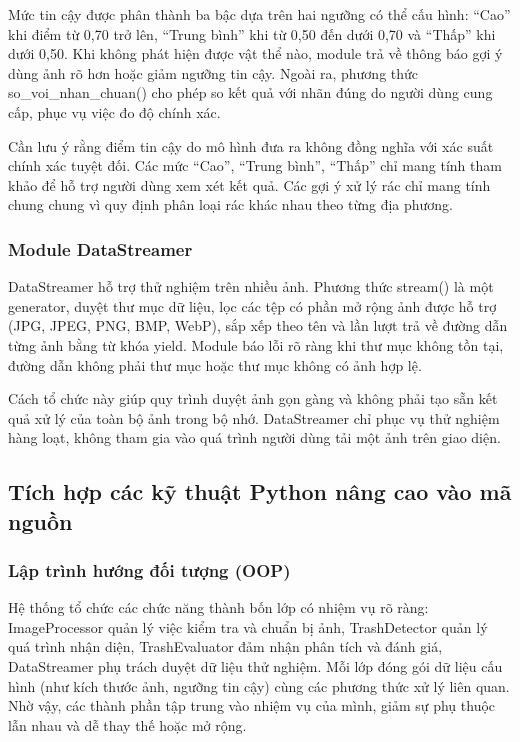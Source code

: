 \documentclass[a4paper,13pt]{extarticle}
\begin{document}
Mức tin cậy được phân thành ba bậc dựa trên hai ngưỡng có thể cấu hình: “Cao” khi điểm từ 0,70 trở lên, “Trung bình” khi từ 0,50 đến dưới 0,70 và “Thấp” khi dưới 0,50. Khi không phát hiện được vật thể nào, module trả về thông báo gợi ý dùng ảnh rõ hơn hoặc giảm ngưỡng tin cậy. Ngoài ra, phương thức so\_voi\_nhan\_chuan() cho phép so kết quả với nhãn đúng do người dùng cung cấp, phục vụ việc đo độ chính xác.

Cần lưu ý rằng điểm tin cậy do mô hình đưa ra không đồng nghĩa với xác suất chính xác tuyệt đối. Các mức “Cao”, “Trung bình”, “Thấp” chỉ mang tính tham khảo để hỗ trợ người dùng xem xét kết quả. Các gợi ý xử lý rác chỉ mang tính chung chung vì quy định phân loại rác khác nhau theo từng địa phương.

\subsubsection{ Module DataStreamer}

DataStreamer hỗ trợ thử nghiệm trên nhiều ảnh. Phương thức stream() là một generator, duyệt thư mục dữ liệu, lọc các tệp có phần mở rộng ảnh được hỗ trợ (JPG, JPEG, PNG, BMP, WebP), sắp xếp theo tên và lần lượt trả về đường dẫn từng ảnh bằng từ khóa yield. Module báo lỗi rõ ràng khi thư mục không tồn tại, đường dẫn không phải thư mục hoặc thư mục không có ảnh hợp lệ.

Cách tổ chức này giúp quy trình duyệt ảnh gọn gàng và không phải tạo sẵn kết quả xử lý của toàn bộ ảnh trong bộ nhớ. DataStreamer chỉ phục vụ thử nghiệm hàng loạt, không tham gia vào quá trình người dùng tải một ảnh trên giao diện.

\subsection{ Tích hợp các kỹ thuật Python nâng cao vào mã nguồn }

\subsubsection{ Lập trình hướng đối tượng (OOP)}

Hệ thống tổ chức các chức năng thành bốn lớp có nhiệm vụ rõ ràng: ImageProcessor quản lý việc kiểm tra và chuẩn bị ảnh, TrashDetector quản lý quá trình nhận diện, TrashEvaluator đảm nhận phân tích và đánh giá, DataStreamer phụ trách duyệt dữ liệu thử nghiệm. Mỗi lớp đóng gói dữ liệu cấu hình (như kích thước ảnh, ngưỡng tin cậy) cùng các phương thức xử lý liên quan. Nhờ vậy, các thành phần tập trung vào nhiệm vụ của mình, giảm sự phụ thuộc lẫn nhau và dễ thay thế hoặc mở rộng.
\end{document}
